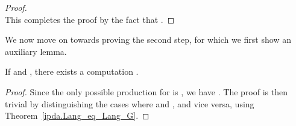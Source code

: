 \begin{isabellebody}
\begin{isamarkuptext}
\begin{lemma}[Step 1]
\begin{proof}
\begin{equation}
\end{equation}
This completes the proof by the fact that \isa{\isafree{{\isasymalpha}}\ {\isacharequal}{\kern0pt}\ {\isacharbrackleft}{\kern0pt}{\isacharbrackright}{\kern0pt}}.
\end{proof}
\end{lemma}

We now move on towards proving the second step, for which we first show an auxiliary lemma.

\begin{lemma}\label{deriver_imp_IPDA_comp}
If  and , there exists a 
computation .
\begin{proof}
Since the only possible production for  is , we have .
The proof is then trivial by distinguishing the cases where  and \isa{{\isasymbeta}\ {\isacharequal}{\kern0pt}\ {\isacharbrackleft}{\kern0pt}{\isacharbrackright}{\kern0pt}}, and vice versa,
using Theorem~\ref{ipda.Lang_eq_Lang_G}.
\end{proof}
\end{lemma}


\end{isamarkuptext}
\end{isabellebody}
